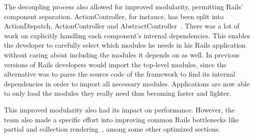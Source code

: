 The decoupling process also allowed for improved modularity, permitting Rails' component separation. ActionController, for instance, has been split into ActionDispatch, ActionController and AbstractController~\cite{vaporware_to_awesome}. There was a lot of work on explicitly handling each component's internal dependencies. This enables the developer to carefully select which modules he needs in his Rails application without caring about including the modules it depends on as well. In previous versions of Rails developers would import the top-level modules, since the alternative was to parse the source code of the framework to find its internal dependencies in order to import all necessary modules. Applications are now able to only load the modules they really need thus becoming faster and lighter.

This improved modularity also had its impact on performance. However, the team also made a specific effort into improving common Rails bottlenecks like partial and collection rendering~\cite{vaporware_to_awesome}, among some other optimized sections.

